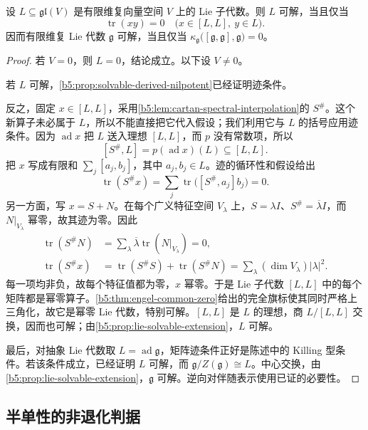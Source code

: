 \begin{theorem}\label{b5:thm:cartan-solvability}
	设 \(L\subseteq\mathfrak{gl}(V)\) 是有限维复向量空间 \(V\) 上的 Lie 子代数。则 \(L\) 可解，当且仅当
	\[
		\operatorname{tr}(xy)=0 \quad\bigl(x\in[L,L],\ y\in L\bigr).
	\]
	因而有限维复 Lie 代数 \(\mathfrak g\) 可解，当且仅当 \(\kappa_{\mathfrak g}\bigl([\mathfrak g,\mathfrak g],\mathfrak g\bigr)=0\)。
\end{theorem}
\begin{proof}
	若 \(V=0\)，则 \(L=0\)，结论成立。以下设 \(V\ne0\)。

	若 \(L\) 可解，\cref{b5:prop:solvable-derived-nilpotent}已经证明迹条件。

	反之，固定 \(x\in[L,L]\)，采用\cref{b5:lem:cartan-spectral-interpolation}的 \(S^\#\)。这个新算子未必属于 \(L\)，所以不能直接把它代入假设；我们利用它与 \(L\) 的括号应用迹条件。因为 \(\operatorname{ad}x\) 把 \(L\) 送入理想 \([L,L]\)，而 \(p\) 没有常数项，所以
	\[
		[S^\#,L]=p(\operatorname{ad}x)(L)\subseteq[L,L].
	\]
	把 \(x\) 写成有限和 \(\sum_j[a_j,b_j]\)，其中 \(a_j,b_j\in L\)。迹的循环性和假设给出
	\[
		\operatorname{tr}(S^\#x) =\sum_j\operatorname{tr}\bigl([S^\#,a_j]b_j\bigr)=0.
	\]
	另一方面，写 \(x=S+N\)。在每个广义特征空间 \(V_\lambda\) 上，\(S=\lambda I\)、\(S^\#=\overline\lambda I\)，而 \(N|_{V_\lambda}\) 幂零，故其迹为零。因此
	\[
		\begin{aligned}
			\operatorname{tr}(S^\#N) &=\sum_\lambda\overline\lambda\operatorname{tr}(N|_{V_\lambda})=0,\\
			\operatorname{tr}(S^\#x) &=\operatorname{tr}(S^\#S)+\operatorname{tr}(S^\#N) =\sum_\lambda(\dim V_\lambda)|\lambda|^2.
		\end{aligned}
	\]
	每一项均非负，故每个特征值都为零，\(x\) 幂零。于是 Lie 子代数 \([L,L]\) 中的每个矩阵都是幂零算子。\cref{b5:thm:engel-common-zero}给出的完全旗标使其同时严格上三角化，故它是幂零 Lie 代数，特别可解。\([L,L]\) 是 \(L\) 的理想，商 \(L/[L,L]\) 交换，因而也可解；由\cref{b5:prop:lie-solvable-extension}，\(L\) 可解。

	最后，对抽象 Lie 代数取 \(L=\operatorname{ad}\mathfrak g\)，矩阵迹条件正好是陈述中的 Killing 型条件。若该条件成立，已经证明 \(L\) 可解，而 \(\mathfrak g/Z(\mathfrak g)\cong L\)。中心交换，由\cref{b5:prop:lie-solvable-extension}，\(\mathfrak g\) 可解。逆向对伴随表示使用已证的必要性。
\end{proof}

\subsection{半单性的非退化判据}
\label{b5:subsec:1302:02}

